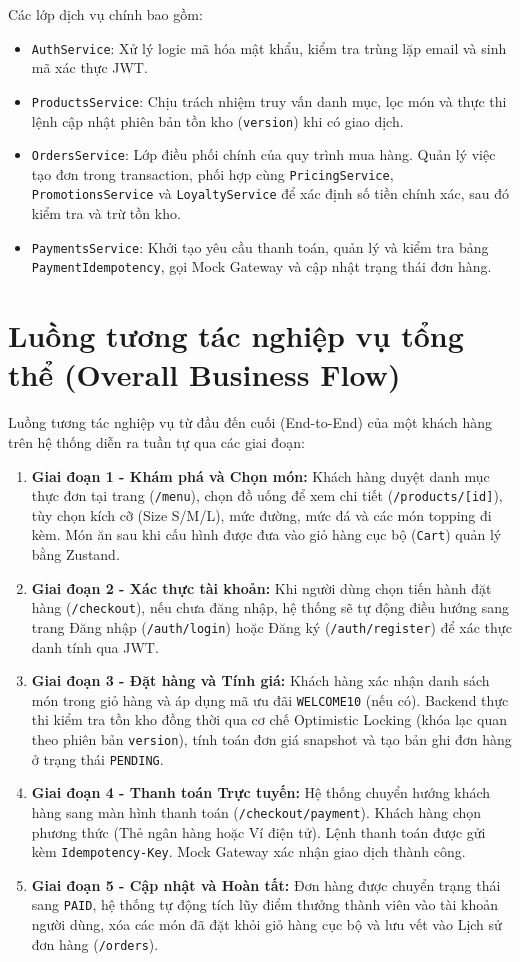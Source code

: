 Các lớp dịch vụ chính bao gồm:
\begin{itemize}
    \item \texttt{AuthService}: Xử lý logic mã hóa mật khẩu, kiểm tra trùng lặp email và sinh mã xác thực JWT.
    \item \texttt{ProductsService}: Chịu trách nhiệm truy vấn danh mục, lọc món và thực thi lệnh cập nhật phiên bản tồn kho (\texttt{version}) khi có giao dịch.
    \item \texttt{OrdersService}: Lớp điều phối chính của quy trình mua hàng. Quản lý việc tạo đơn trong transaction, phối hợp cùng \texttt{PricingService}, \texttt{PromotionsService} và \texttt{LoyaltyService} để xác định số tiền chính xác, sau đó kiểm tra và trừ tồn kho.
    \item \texttt{PaymentsService}: Khởi tạo yêu cầu thanh toán, quản lý và kiểm tra bảng \texttt{PaymentIdempotency}, gọi Mock Gateway và cập nhật trạng thái đơn hàng.
\end{itemize}

\section{Luồng tương tác nghiệp vụ tổng thể (Overall Business Flow)}
Luồng tương tác nghiệp vụ từ đầu đến cuối (End-to-End) của một khách hàng trên hệ thống diễn ra tuần tự qua các giai đoạn:
\begin{enumerate}
    \item \textbf{Giai đoạn 1 - Khám phá và Chọn món:} Khách hàng duyệt danh mục thực đơn tại trang (\texttt{/menu}), chọn đồ uống để xem chi tiết (\texttt{/products/[id]}), tùy chọn kích cỡ (Size S/M/L), mức đường, mức đá và các món topping đi kèm. Món ăn sau khi cấu hình được đưa vào giỏ hàng cục bộ (\texttt{Cart}) quản lý bằng Zustand.
    \item \textbf{Giai đoạn 2 - Xác thực tài khoản:} Khi người dùng chọn tiến hành đặt hàng (\texttt{/checkout}), nếu chưa đăng nhập, hệ thống sẽ tự động điều hướng sang trang Đăng nhập (\texttt{/auth/login}) hoặc Đăng ký (\texttt{/auth/register}) để xác thực danh tính qua JWT.
    \item \textbf{Giai đoạn 3 - Đặt hàng và Tính giá:} Khách hàng xác nhận danh sách món trong giỏ hàng và áp dụng mã ưu đãi \texttt{WELCOME10} (nếu có). Backend thực thi kiểm tra tồn kho đồng thời qua cơ chế Optimistic Locking (khóa lạc quan theo phiên bản \texttt{version}), tính toán đơn giá snapshot và tạo bản ghi đơn hàng ở trạng thái \texttt{PENDING}.
    \item \textbf{Giai đoạn 4 - Thanh toán Trực tuyến:} Hệ thống chuyển hướng khách hàng sang màn hình thanh toán (\texttt{/checkout/payment}). Khách hàng chọn phương thức (Thẻ ngân hàng hoặc Ví điện tử). Lệnh thanh toán được gửi kèm \texttt{Idempotency-Key}. Mock Gateway xác nhận giao dịch thành công.
    \item \textbf{Giai đoạn 5 - Cập nhật và Hoàn tất:} Đơn hàng được chuyển trạng thái sang \texttt{PAID}, hệ thống tự động tích lũy điểm thưởng thành viên vào tài khoản người dùng, xóa các món đã đặt khỏi giỏ hàng cục bộ và lưu vết vào Lịch sử đơn hàng (\texttt{/orders}).
\end{enumerate}

